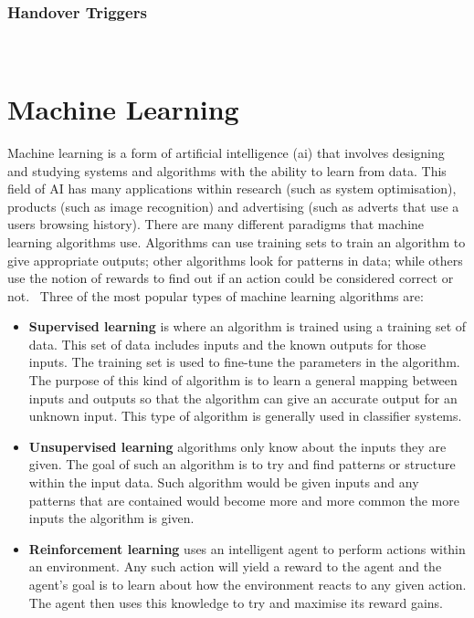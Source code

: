 \documentclass[12pt, oneside]{report}
\begin{document}
\subsection{Handover Triggers}\label{handover triggers}
~\cite{cox2012introduction}

\chapter{Machine Learning}\label{machine learning}
Machine learning is a form of artificial intelligence (\ac{ai}) that involves designing and studying systems and algorithms with the ability to learn from data. This field of AI has many applications within research (such as system optimisation), products (such as image recognition) and advertising (such as adverts that use a users browsing history). There are many different paradigms that machine learning algorithms use. Algorithms can use training sets to train an algorithm to give appropriate outputs; other algorithms look for patterns in data; while others use the notion of rewards to find out if an action could be considered correct or not.~\cite{alpaydin2010introduction} Three of the most popular types of machine learning algorithms are:

\begin{itemize}
  \item \textbf{Supervised learning} is where an algorithm is trained using a training set of data. This set of data includes inputs and the known outputs for those inputs. The training set is used to fine-tune the parameters in the algorithm. The purpose of this kind of algorithm is to learn a general mapping between inputs and outputs so that the algorithm can give an accurate output for an unknown input. This type of algorithm is generally used in classifier systems.
  \item \textbf{Unsupervised learning} algorithms only know about the inputs they are given. The goal of such an algorithm is to try and find patterns or structure within the input data. Such algorithm would be given inputs and any patterns that are contained would become more and more common the more inputs the algorithm is given.
  \item \textbf{Reinforcement learning} uses an intelligent agent to perform actions within an environment. Any such action will yield a reward to the agent and the agent’s goal is to learn about how the environment reacts to any given action. The agent then uses this knowledge to try and maximise its reward gains.
\end{itemize}
\end{document}
